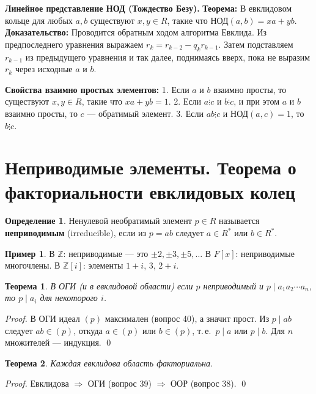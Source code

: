 \documentclass[12pt, a4paper]{article}
\newtheorem{theorem}{Теорема}
\theoremstyle{definition}
\newtheorem{definition}{Определение}
\newtheorem{example}{Пример}
\theoremstyle{remark}
\newcommand{\Z}{\mathbb{Z}}
\begin{document}
\textbf{Линейное представление НОД (Тождество Безу).} 
\textbf{Теорема:} В евклидовом кольце для любых $a, b$ существуют $x, y \in R$, такие что $\text{НОД}(a, b) = xa + yb$.
\textbf{Доказательство:} Проводится обратным ходом алгоритма Евклида. Из предпоследнего уравнения выражаем $r_k = r_{k-2} - q_k r_{k-1}$. Затем подставляем $r_{k-1}$ из предыдущего уравнения и так далее, поднимаясь вверх, пока не выразим $r_k$ через исходные $a$ и $b$.

\textbf{Свойства взаимно простых элементов:}
1. Если $a$ и $b$ взаимно просты, то существуют $x, y \in R$, такие что $xa + yb = 1$.
2. Если $a \vdots c$ и $b \vdots c$, и при этом $a$ и $b$ взаимно просты, то $c$ — обратимый элемент.
3. Если $ab \vdots c$ и $\text{НОД}(a, c) = 1$, то $b \vdots c$.

\section{Неприводимые элементы. Теорема о факториальности евклидовых колец}

\begin{definition}
	Ненулевой необратимый элемент $p \in R$ называется \textbf{неприводимым} (irreducible), если из $p = ab$ следует $a \in R^*$ или $b \in R^*$.
\end{definition}

\begin{example}
	В $\Z$: неприводимые --- это $\pm 2, \pm 3, \pm 5, \ldots$ В $F[x]$: неприводимые многочлены. В $\Z[i]$: элементы $1+i$, $3$, $2+i$.
\end{example}

\begin{theorem}
	В ОГИ (и в евклидовой области) если $p$ неприводимый и $p \mid a_1 a_2 \cdots a_n$, то $p \mid a_i$ для некоторого $i$.
\end{theorem}
\begin{proof}
	В ОГИ идеал $(p)$ максимален (вопрос 40), а значит прост. Из $p \mid ab$ следует $ab \in (p)$, откуда $a \in (p)$ или $b \in (p)$, т.\,е.\ $p \mid a$ или $p \mid b$. Для $n$ множителей --- индукция. \qed
\end{proof}

\begin{theorem}
	Каждая евклидова область факториальна.
\end{theorem}
\begin{proof}
	Евклидова $\Rightarrow$ ОГИ (вопрос 39) $\Rightarrow$ ООР (вопрос 38). \qed
\end{proof}
\end{document}
